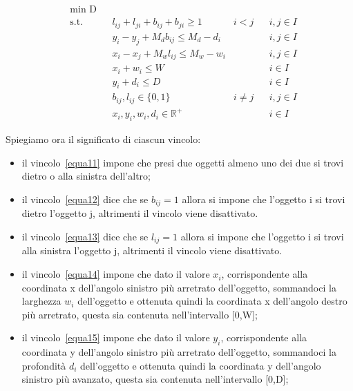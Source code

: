 \begin{align}
	& \underset{}{\text{min D}}\\
	  & \text{s.t.} &   & l_{ij} + l_{ji} + b_{ij} + b_{ji} \geq 1      & i < j    &   & i,j \in I \label{equa11} \\
	  &             &   & y_i - y_j + M_d b_{ij} \leq M_d - d_i         &          &   & i,j \in I \label{equa12} \\
	  &             &   & x_i - x_j + M_w l_{ij} \leq M_w - w_i         &          &   & i,j \in I \label{equa13} \\
	  &             &   & x_i + w_i \leq W                              &          &   & i \in I   \label{equa14} \\
	  &             &   & y_i + d_i \leq D                              &          &   & i \in I   \label{equa15} \\
	  &             &   & b_{ij}, l_{ij} \in \{0,1\}                    & i \neq j &   & i,j \in I \label{equa16} \\
	  &             &   & x_{i}, y_{i}, w_{i}, d_{i} \in \mathbb{R}^{+} &          &   & i \in I  \label{equa17}  
\end{align}

Spiegiamo ora il significato di ciascun vincolo:
\begin{itemize}
	\item il vincolo~\eqref{equa11} impone che presi due oggetti almeno uno dei due si trovi dietro o alla sinistra dell'altro;
	\item il vincolo~\eqref{equa12} dice che se $b_{ij} = 1$ allora si impone che l'oggetto i si trovi dietro l'oggetto j, altrimenti il vincolo viene disattivato. 
	\item il vincolo~\eqref{equa13} dice che se $l_{ij} = 1$ allora si impone che l'oggetto i si trovi alla sinistra l'oggetto j, altrimenti il vincolo viene disattivato. 
	\item il vincolo~\eqref{equa14} impone che dato il valore $x_i$, corrispondente alla coordinata x dell'angolo sinistro più arretrato dell'oggetto, sommandoci la larghezza $w_i$ dell'oggetto e ottenuta quindi la coordinata x dell'angolo destro più arretrato, questa sia contenuta nell'intervallo [0,W];
	\item il vincolo~\eqref{equa15} impone che dato il valore $y_i$, corrispondente alla coordinata y dell'angolo sinistro più arretrato dell'oggetto, sommandoci la profondità $d_i$ dell'oggetto e ottenuta quindi la coordinata y dell'angolo sinistro più avanzato, questa sia contenuta nell'intervallo [0,D];
\end{itemize}

